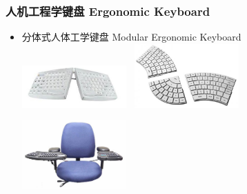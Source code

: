 \documentclass{beamer}
\begin{document}
\begin{frame}[transdissolve]
	\frametitle{人机工程学键盘 Ergonomic Keyboard}
	\begin{itemize}
		\item 分体式人体工学键盘 Modular Ergonomic Keyboard\\
		\includegraphics[width=4cm]{images/ergonomic-keyboard-mac-goldtouch.jpg}~
		\includegraphics[width=4cm]{images/ergonomic-modular-keyboard-falls-to-pieces_1.jpg}\\
		\begin{center}
		\includegraphics[width=4cm]{images/keyboard-chair.jpg}
		\end{center}
	\end{itemize}
\end{frame}
\end{document}
